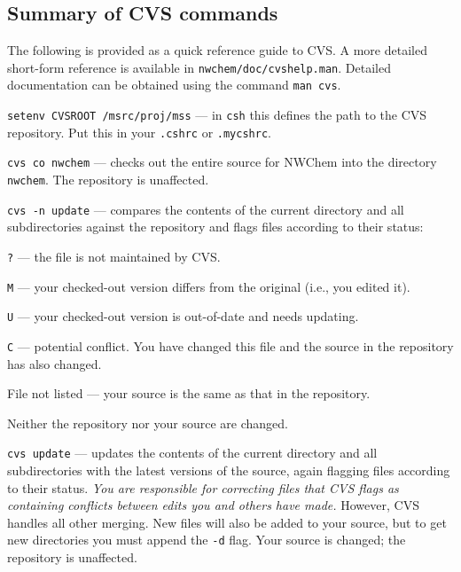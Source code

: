 \subsection{Summary of CVS commands}

The following is provided as a quick reference guide to CVS.  A more
detailed short-form reference is available in
\verb+nwchem/doc/cvshelp.man+.  Detailed documentation can be obtained using 
the command
\verb+man cvs+.

\begin{description}
\item{\verb+setenv CVSROOT /msrc/proj/mss+} --- in \verb+csh+ this
  defines the path to the CVS repository.  Put this in your
  \verb+.cshrc+ or \verb+.mycshrc+.
 
\item{\verb+cvs co nwchem+} --- checks out the entire source for NWChem into
  the directory \verb+nwchem+.  The repository is unaffected.
  
\item{\verb+cvs -n update+} --- compares the contents of the current
  directory and all subdirectories against the repository and flags
  files according to their status:
  \begin{description}
  \item{\verb+?+} --- the file is not maintained by CVS.
  \item{\verb+M+} --- your checked-out version differs from the original
    (i.e., you edited it).
  \item{\verb+U+} --- your checked-out version is out-of-date and
    needs updating.
  \item{\verb+C+} --- potential conflict. You have changed this file
    and the source in the repository has also changed.
  \item{File not listed} --- your source is the same as that in the repository.
  \end{description}
  Neither the repository nor your source are changed.

\item{\verb+cvs update+} --- updates the contents of the current
  directory and all subdirectories with the latest versions of the
  source, again flagging files according to their status. {\em You are
    responsible for correcting files that CVS flags as containing
    conflicts between edits you and others have made.} However, CVS
  handles all other merging.  New files will also be added to your
  source, but to get new directories you must append the
  \verb+-d+ flag.  Your source is changed; the repository is
  unaffected.


\end{description}
